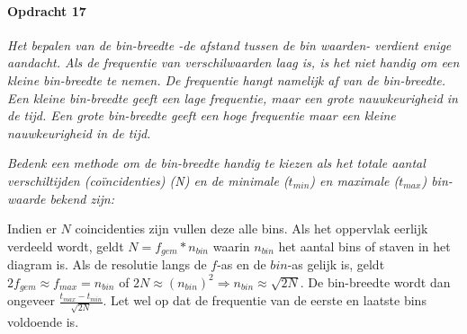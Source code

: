 \bigskip{}
\begin{minipage}[t]{1\columnwidth}%

\paragraph{Opdracht 17}

\textit{Het bepalen van de bin-breedte -de afstand tussen de bin waarden-
verdient enige aandacht. Als de frequentie van verschilwaarden laag
is, is het niet handig om een kleine bin-breedte te nemen. De frequentie
hangt namelijk af van de bin-breedte. Een kleine bin-breedte geeft
een lage frequentie, maar een grote nauwkeurigheid in de tijd. Een
grote bin-breedte geeft een hoge frequentie maar een kleine nauwkeurigheid
in de tijd.}

\textit{Bedenk een methode om de bin-breedte handig te kiezen als
het totale aantal verschiltijden (coïncidenties) (N) en de minimale
($t_{min}$) en maximale ($t_{max}$) bin-waarde bekend zijn:}

Indien er $N$ coincidenties zijn vullen deze alle bins. Als het oppervlak
eerlijk verdeeld wordt, geldt $N=f_{gem}*n_{bin}$ waarin $n_{bin}$
het aantal bins of staven in het diagram is. Als de resolutie langs
de $f$-as en de $bin$-as gelijk is, geldt $2f_{gem}\approx f_{max}=n_{bin}$
of $2N\approx\left(n_{bin}\right)^{2}\Rightarrow n_{bin}\approx\sqrt{2N}$.
De bin-breedte wordt dan ongeveer $\frac{t_{max}-t_{min}}{\sqrt{2N}}$.
Let wel op dat de frequentie van de eerste en laatste bins voldoende
is. %
\end{minipage}

\bigskip{}


